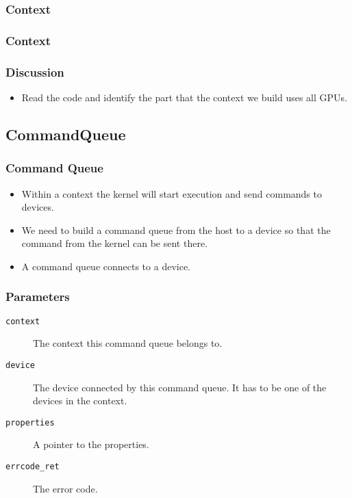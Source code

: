 \documentclass{beamer}
\begin{document}
\begin{frame}
  \frametitle{Context}
\end{frame}

\begin{frame}
  \frametitle{Context}
  \centerline{}
\end{frame}

\begin{frame}
  \frametitle{Discussion}
  \begin{itemize}
  \item Read the code and identify the part that the context we
    build uses all GPUs.
  \end{itemize}
\end{frame}

\subsection{CommandQueue}

\begin{frame}
  \frametitle{Command Queue}
  \begin{itemize}
  \item Within a context the kernel will start execution and send
    commands to devices.
  \item We need to build a command queue from the host to a device so
    that the command from the kernel can be sent there.
  \item A command queue connects to a device.
  \end{itemize}
\end{frame}

\begin{frame}
\end{frame}

\begin{frame}
  \frametitle{Parameters}
  \begin{description}
  \item [\tt context] The context this command queue belongs to.
  \item [\tt device] The device connected by this command queue. It has
    to be one of the devices in the context.
  \item [\tt properties] A pointer to the properties.
  \item [\tt errcode\_ret] The error code.
  \end{description}
\end{frame}
\end{document}
